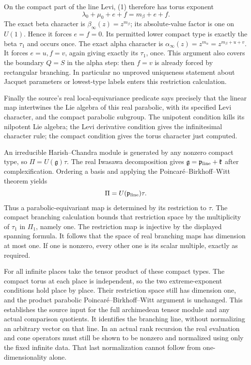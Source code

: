 On the compact part of the line Levi, (1) therefore
has torus exponent
\[
                 \lambda_0+\mu_0+e+f
                          =m_\beta+e+f .
\]
The exact beta character is \(\beta_\infty(z)=z^{m_\beta}\);
its absolute-value factor is one on \(U(1)\).
Hence it forces \(e=f=0\). Its permitted lower compact
type is exactly the beta \(\tau_1\) and occurs once.
The exact alpha character is
\(\alpha_\infty(z)=z^{m_\alpha}
                  =z^{m_\beta+u+v}\).
It forces \(e=u,f=v\), again giving exactly its
\(\tau_1\), once. This argument also covers the boundary
\(Q=S\) in the alpha step: then \(f=v\) is already
forced by rectangular branching. In particular no
unproved uniqueness statement about Jacquet parameters
or lowest-type labels enters this restriction calculation.

Finally the source's real local-equivariance predicate
says precisely that the linear map intertwines the Lie
algebra of this real parabolic, with its specified Levi
character, and the compact parabolic subgroup. The
unipotent condition kills its nilpotent Lie algebra;
the Levi derivative condition gives the infinitesimal
character rule; the compact condition gives the torus
character just computed.

An irreducible Harish--Chandra module is generated by
any nonzero compact type, so \(\Pi=U(\mathfrak g)\tau\).
The real Iwasawa decomposition gives
\(\mathfrak g=\mathfrak p_{\rm line}+\mathfrak k\)
after complexification. Ordering a basis and applying
the Poincar\'e--Birkhoff--Witt theorem yields
\[
                 \Pi=U(\mathfrak p_{\rm line})\tau .
\]
Thus a parabolic-equivariant map is determined by its
restriction to \(\tau\). The compact branching calculation
bounds that restriction space by the multiplicity of
\(\tau_1\) in \(\Pi_1\), namely one. The restriction map
is injective by the displayed spanning formula.
It follows that the space of real branching maps has
dimension at most one. If one is nonzero, every other
one is its scalar multiple, exactly as required.

For all infinite places take the tensor product of these
compact types. The compact torus at each place is
independent, so the two extreme-exponent conditions
hold place by place. Their restriction space still
has dimension one, and the product parabolic
Poincar\'e--Birkhoff--Witt argument is unchanged.
This establishes the source input for the full
archimedean tensor module and any actual comparison
quotients. It identifies the branching line, without
normalizing an arbitrary vector on that line. In an
actual rank recursion the real evaluation and cone
operators must still be shown to be nonzero and
normalized using only the fixed infinite data.
That last normalization cannot follow from
one-dimensionality alone.
